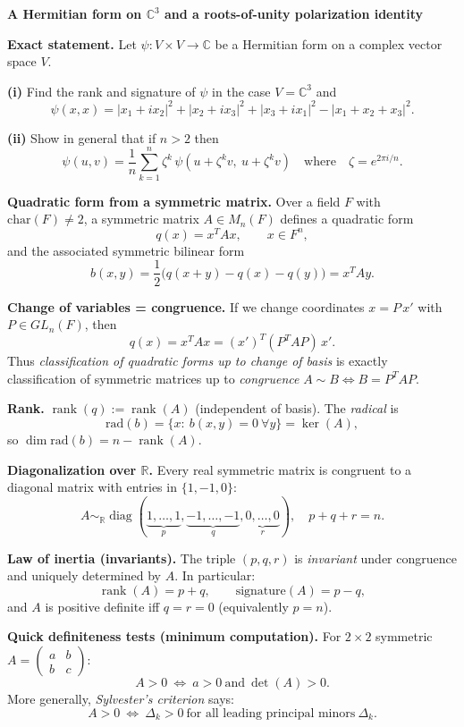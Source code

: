 \begin{problem}[CP-I-0055]
\label{prob:cp-i-0055}
\textbf{A Hermitian form on $\mathbb C^3$ and a roots-of-unity polarization identity}

\textbf{Exact statement.}
\hspace*{1.5em}Let $\psi:V\times V\to\mathbb C$ be a Hermitian form on a complex vector space $V$.

\textbf{(i)} Find the rank and signature of $\psi$ in the case $V=\mathbb C^3$ and
\[
\psi(x,x)=|x_1+ix_2|^2+|x_2+ix_3|^2+|x_3+ix_1|^2-|x_1+x_2+x_3|^2.
\]

\textbf{(ii)} Show in general that if $n>2$ then
\[
\psi(u,v)=\frac1n\sum_{k=1}^n \zeta^k\,\psi(u+\zeta^k v,\ u+\zeta^k v)
\quad\text{where}\quad \zeta=e^{2\pi i/n}.
\]



\textbf{Quadratic form from a symmetric matrix.}
Over a field $F$ with $\mathrm{char}(F)\neq 2$, a symmetric matrix $A\in M_n(F)$ defines a quadratic form
\[
q(x)=x^T A x,\qquad x\in F^n,
\]
and the associated symmetric bilinear form
\[
b(x,y)=\frac12\bigl(q(x+y)-q(x)-q(y)\bigr)=x^T A y.
\]

\textbf{Change of variables = congruence.}
If we change coordinates $x=P\,x'$ with $P\in GL_n(F)$, then
\[
q(x)=x^T A x = (x')^T (P^T A P)\,x'.
\]
Thus \emph{classification of quadratic forms up to change of basis} is exactly classification of symmetric matrices up to \emph{congruence} $A\sim B \iff B=P^TAP$.

\textbf{Rank.}
$\operatorname{rank}(q):=\operatorname{rank}(A)$ (independent of basis). The \emph{radical} is
\[
\mathrm{rad}(b)=\{x:\ b(x,y)=0\ \forall y\}=\ker(A),
\]
so $\dim \mathrm{rad}(b)=n-\operatorname{rank}(A)$.

\textbf{Diagonalization over $\mathbb R$.}
Every real symmetric matrix is congruent to a diagonal matrix with entries in $\{1,-1,0\}$:
\[
A \sim_{\mathbb R} \operatorname{diag}(\underbrace{1,\dots,1}_{p},
\underbrace{-1,\dots,-1}_{q},
\underbrace{0,\dots,0}_{r}),
\quad p+q+r=n.
\]

\textbf{Law of inertia (invariants).}
The triple $(p,q,r)$ is \emph{invariant} under congruence and uniquely determined by $A$.
In particular:
\[
\operatorname{rank}(A)=p+q,\qquad \text{signature}(A)=p-q,
\]
and $A$ is positive definite iff $q=r=0$ (equivalently $p=n$).

\textbf{Quick definiteness tests (minimum computation).}
For $2\times 2$ symmetric $A=\begin{pmatrix}a&b\\b&c\end{pmatrix}$:
\[
A>0\ \Longleftrightarrow\ a>0\ \text{and}\ \det(A)>0.
\]
More generally, \emph{Sylvester's criterion} says:
\[
A>0\ \Longleftrightarrow\ \Delta_k>0\ \text{for all leading principal minors}\ \Delta_k.
\]


\end{problem}
